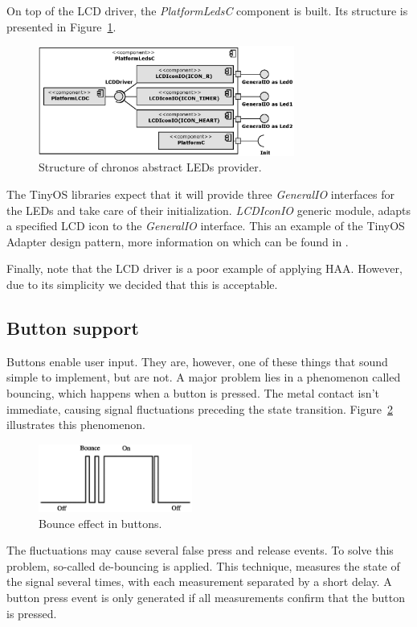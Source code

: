 On top of the LCD driver, the \emph{PlatformLedsC} component is built. Its structure is presented in Figure~\ref{fig:platform_leds_c}.
\begin{figure}[h]
  \centering
  \includegraphics[width=0.75\textwidth]{diagrams/platform_leds_c.eps}
  \caption{Structure of chronos abstract LEDs provider.}
  \label{fig:platform_leds_c}
\end{figure}
The TinyOS libraries expect that it will provide three \emph{GeneralIO} interfaces for the LEDs and take care of their initialization. \emph{LCDIconIO} generic module, adapts a specified LCD icon to the \emph{GeneralIO} interface. This an example of the TinyOS Adapter design pattern, more information on which can be found in \cite[ch. 8]{TOSProg}.

Finally, note that the LCD driver is a poor example of applying HAA. However, due to its simplicity we decided that this is acceptable.

\subsection{Button support}

Buttons enable user input. They are, however, one of these things that sound simple to implement, but are not. A major problem lies in a phenomenon called bouncing, which happens when a button is pressed. The metal contact isn't immediate, causing signal fluctuations preceding the state transition. Figure~\ref{fig:bouncing} illustrates this phenomenon.

\begin{figure}[h]
  \centering
  \includegraphics[width=0.45\textwidth]{img/Bounce.eps}
  \caption{Bounce effect in buttons.}
  \label{fig:bouncing}
\end{figure}
The fluctuations may cause several false press and release events. To solve this problem, so-called de-bouncing is applied. This technique, measures the state of the signal several times, with each measurement separated by a short delay. A button press event is only generated if all measurements confirm that the button is pressed.

